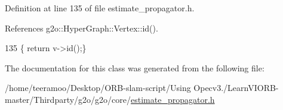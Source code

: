 Definition at line 135 of file estimate\+\_\+propagator.\+h.



References g2o\+::\+Hyper\+Graph\+::\+Vertex\+::id().


\begin{DoxyCode}
135 \{ \textcolor{keywordflow}{return} v->id();\}
\end{DoxyCode}


The documentation for this class was generated from the following file\+:\begin{DoxyCompactItemize}
\item 
/home/teeramoo/\+Desktop/\+O\+R\+B-\/slam-\/script/\+Using Opecv3./\+Learn\+V\+I\+O\+R\+B-\/master/\+Thirdparty/g2o/g2o/core/\hyperlink{estimate__propagator_8h}{estimate\+\_\+propagator.\+h}\end{DoxyCompactItemize}
